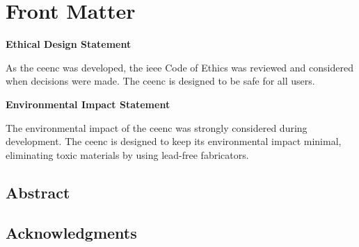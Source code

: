 \chapter{Front Matter}
\textbf{Ethical Design Statement}

As the \gls{ceenc} was developed, the \gls{ieee} Code of Ethics was reviewed and considered when decisions were made.
The \gls{ceenc} is designed to be safe for all users.

\textbf{Environmental Impact Statement}

The environmental impact of the \gls{ceenc} was strongly considered during development. 
The \gls{ceenc} is designed to keep its environmental impact minimal, eliminating toxic materials by using lead-free fabricators.

\section{Abstract}




\section{Acknowledgments}


